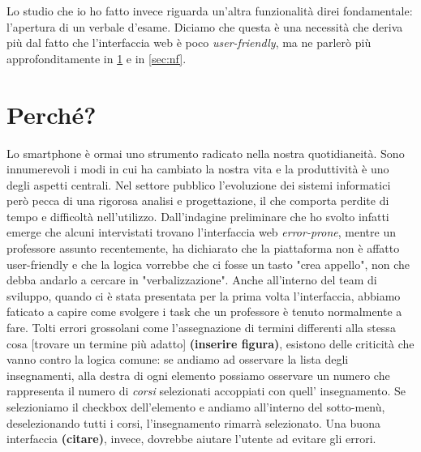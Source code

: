 \documentclass[Lau, oneside]{sapthesis}%
\begin{document}
Lo studio che io ho fatto invece riguarda un'altra funzionalità direi fondamentale: l'apertura di un verbale d'esame. Diciamo che
questa è una necessità che deriva più dal fatto che l'interfaccia web è poco \textit{user-friendly}, ma ne parlerò più approfonditamente
in \ref{sec:why} e in \ref{sec:nf}.


\section{Perché?}
\label{sec:why}
Lo smartphone è ormai uno strumento radicato nella nostra quotidianeità. Sono innumerevoli i modi in cui ha cambiato la nostra vita e la
produttività è uno degli aspetti centrali. Nel settore pubblico l'evoluzione dei sistemi informatici però pecca di una rigorosa analisi 
e progettazione, il che comporta perdite di tempo e difficoltà nell'utilizzo.
Dall'indagine preliminare che ho svolto infatti emerge che alcuni intervistati trovano l'interfaccia web \textit{error-prone}, mentre 
un professore assunto recentemente, ha dichiarato che la piattaforma non è affatto user-friendly e che la logica vorrebbe che ci fosse
un tasto "crea appello", non che debba andarlo a cercare in "verbalizzazione". Anche all'interno del team di sviluppo, quando ci è
stata presentata per la prima volta l'interfaccia, abbiamo faticato a capire come svolgere i task che un professore è tenuto normalmente
a fare. Tolti errori grossolani come l'assegnazione di termini differenti alla stessa cosa [trovare un termine più adatto] 
\textbf{(inserire figura)}, esistono delle criticità che vanno contro la logica comune: se andiamo ad osservare la lista degli insegnamenti,
alla destra di ogni elemento possiamo osservare un numero che rappresenta il numero di \textit{corsi} selezionati accoppiati con quell'
insegnamento. Se selezioniamo il checkbox dell'elemento e andiamo all'interno del sotto-menù, deselezionando tutti i corsi, l'insegnamento
rimarrà selezionato. Una buona interfaccia \textbf{(citare)}, invece, dovrebbe aiutare l'utente ad evitare gli errori.


\end{document}
